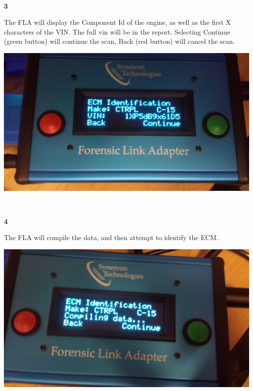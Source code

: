 \documentclass[11pt]{article}
\begin{document}
\\[\baselineskip]
\noindent\begin{minipage}{0.3\textwidth}%
\begin{center}
\textbf{3}\\[\baselineskip]
\end{center}
The FLA will display the Component Id of the engine, as well as the first X characters of the VIN. The full vin will be in the report. Selecting Continue (green button) will continue the scan, Back (red button) will cancel the scan.
\end{minipage}%
\hfill%
\begin{minipage}{0.6\textwidth}
\includegraphics[width=\linewidth]{./fla_screens/comp_id}
\end{minipage}
\\[\baselineskip]
\noindent\begin{minipage}{0.3\textwidth}%
\begin{center}
\textbf{4}\\[\baselineskip]
\end{center}
The FLA will compile the data, and then attempt to identify the ECM.
\end{minipage}%
\hfill%
\begin{minipage}{0.6\textwidth}
\includegraphics[width=\linewidth]{./fla_screens/comp_id_compile}
\end{minipage}
\end{document}
